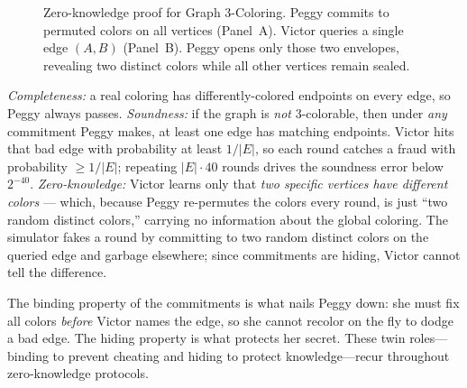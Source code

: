 \begin{figure}[H]
\caption{Zero-knowledge proof for Graph 3-Coloring. Peggy commits to permuted colors on all vertices (Panel~A). Victor queries a single edge $(A,B)$ (Panel~B). Peggy opens only those two envelopes, revealing two distinct colors while all other vertices remain sealed.}
\label{ch31:fig-3color}
\end{figure}

\begin{whybox}
\emph{Completeness:} a real coloring has differently-colored endpoints on every
edge, so Peggy always passes. \emph{Soundness:} if the graph is \emph{not}
3-colorable, then under \emph{any} commitment Peggy makes, at least one edge has
matching endpoints. Victor hits that bad edge with probability at least $1/|E|$,
so each round catches a fraud with probability $\ge 1/|E|$; repeating
$|E|\cdot 40$ rounds drives the soundness error below $2^{-40}$.
\emph{Zero-knowledge:} Victor learns only that \emph{two specific vertices have
different colors} --- which, because Peggy re-permutes the colors every round, is
just ``two random distinct colors,'' carrying no information about the global
coloring. The simulator fakes a round by committing to two random distinct
colors on the queried edge and garbage elsewhere; since commitments are hiding,
Victor cannot tell the difference.
\end{whybox}

The binding property of the commitments is what nails Peggy down: she must fix
all colors \emph{before} Victor names the edge, so she cannot recolor on the fly
to dodge a bad edge. The hiding property is what protects her secret. These
twin roles---binding to prevent cheating and hiding to protect knowledge---recur throughout
zero-knowledge protocols.

